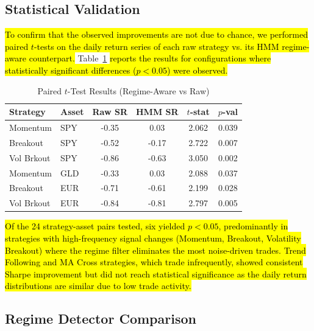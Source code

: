 \documentclass[conference]{IEEEtran}
\begin{document}
\subsection{Statistical Validation}

\hl{To confirm that the observed improvements are not due to chance, we performed paired $t$-tests on the daily return series of each raw strategy vs. its HMM regime-aware counterpart.} Table~\ref{tab:stat_test} \hl{reports the results for configurations where statistically significant differences (\mbox{$p < 0.05$}) were observed.}

\begin{table}[htbp]
\caption{Paired $t$-Test Results (Regime-Aware vs Raw)}
\begin{center}
\footnotesize
\begin{tabular}{llcccc}
\toprule
\textbf{Strategy} & \textbf{Asset} & \textbf{Raw SR} & \textbf{HMM SR} & \textbf{$t$-stat} & \textbf{$p$-val} \\
\midrule
Momentum & SPY & -0.35 & 0.03 & 2.062 & 0.039 \\
Breakout & SPY & -0.52 & -0.17 & 2.722 & 0.007 \\
Vol Brkout & SPY & -0.86 & -0.63 & 3.050 & 0.002 \\
Momentum & GLD & -0.33 & 0.03 & 2.088 & 0.037 \\
Breakout & EUR & -0.71 & -0.61 & 2.199 & 0.028 \\
Vol Brkout & EUR & -0.84 & -0.81 & 2.797 & 0.005 \\
\bottomrule
\end{tabular}
\label{tab:stat_test}
\end{center}
\end{table}

\hl{Of the 24 strategy-asset pairs tested, six yielded \mbox{$p < 0.05$}, predominantly in strategies with high-frequency signal changes (Momentum, Breakout, Volatility Breakout) where the regime filter eliminates the most noise-driven trades. Trend Following and MA Cross strategies, which trade infrequently, showed consistent Sharpe improvement but did not reach statistical significance as the daily return distributions are similar due to low trade activity.}

\subsection{Regime Detector Comparison}
\end{document}
